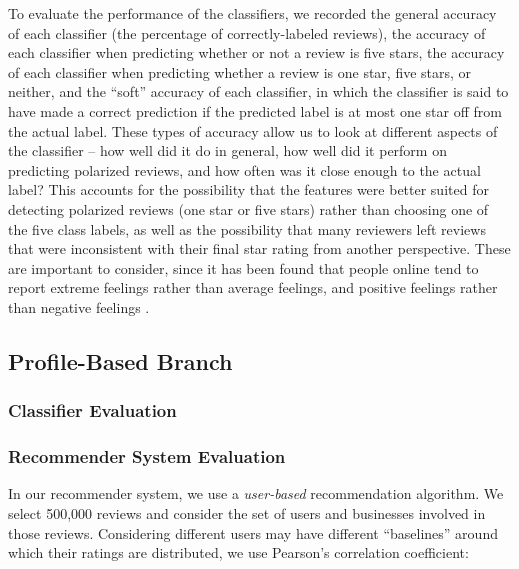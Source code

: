 To evaluate the performance of the classifiers, we recorded the general accuracy of each classifier (the percentage of correctly-labeled reviews), the accuracy of each classifier when predicting whether or not a review is five stars, the accuracy of each classifier when predicting whether a review is one star, five stars, or neither, and the ``soft'' accuracy of each classifier, in which the classifier is said to have made a correct prediction if the predicted label is at most one star off from the actual label. These types of accuracy allow us to look at different aspects of the classifier -- how well did it do in general, how well did it perform on predicting polarized reviews, and how often was it close enough to the actual label? This accounts for the possibility that the features were better suited for detecting polarized reviews (one star or five stars) rather than choosing one of the five class labels, as well as the possibility that many reviewers left reviews that were inconsistent with their final star rating from another perspective. These are important to consider, since it has been found that people online tend to report extreme feelings rather than average feelings, and positive feelings rather than negative feelings \cite{imbalance}.

\subsection{Profile-Based Branch}

\subsubsection{Classifier Evaluation}

\subsubsection{Recommender System Evaluation}
In our recommender system, we use a \emph{user-based} recommendation algorithm. We select 500,000 reviews and consider the set of users and businesses involved in those reviews. Considering different users may have different ``baselines'' around which their ratings are distributed, we use Pearson's correlation coefficient:

